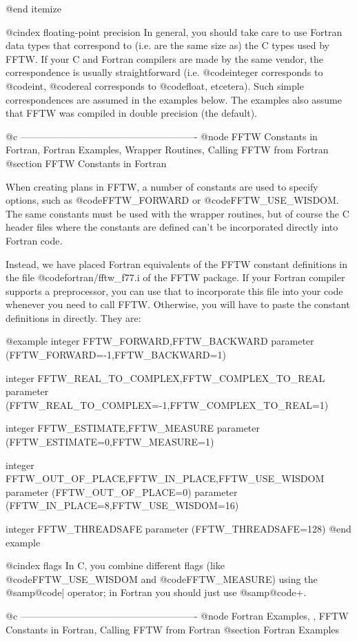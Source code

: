 @end itemize

@cindex floating-point precision
In general, you should take care to use Fortran data types that
correspond to (i.e. are the same size as) the C types used by FFTW.  If
your C and Fortran compilers are made by the same vendor, the
correspondence is usually straightforward (i.e. @code{integer}
corresponds to @code{int}, @code{real} corresponds to @code{float},
etcetera).  Such simple correspondences are assumed in the examples
below.  The examples also assume that FFTW was compiled in
double precision (the default).

@c -------------------------------------------------------
@node  FFTW Constants in Fortran, Fortran Examples, Wrapper Routines, Calling FFTW from Fortran
@section FFTW Constants in Fortran

When creating plans in FFTW, a number of constants are used to specify
options, such as @code{FFTW_FORWARD} or @code{FFTW_USE_WISDOM}.  The
same constants must be used with the wrapper routines, but of course the
C header files where the constants are defined can't be incorporated
directly into Fortran code.

Instead, we have placed Fortran equivalents of the FFTW constant
definitions in the file @code{fortran/fftw_f77.i} of the FFTW package.
If your Fortran compiler supports a preprocessor, you can use that to
incorporate this file into your code whenever you need to call FFTW.
Otherwise, you will have to paste the constant definitions in directly.
They are:

@example
      integer FFTW_FORWARD,FFTW_BACKWARD
      parameter (FFTW_FORWARD=-1,FFTW_BACKWARD=1)

      integer FFTW_REAL_TO_COMPLEX,FFTW_COMPLEX_TO_REAL
      parameter (FFTW_REAL_TO_COMPLEX=-1,FFTW_COMPLEX_TO_REAL=1)

      integer FFTW_ESTIMATE,FFTW_MEASURE
      parameter (FFTW_ESTIMATE=0,FFTW_MEASURE=1)

      integer FFTW_OUT_OF_PLACE,FFTW_IN_PLACE,FFTW_USE_WISDOM
      parameter (FFTW_OUT_OF_PLACE=0)
      parameter (FFTW_IN_PLACE=8,FFTW_USE_WISDOM=16)

      integer FFTW_THREADSAFE
      parameter (FFTW_THREADSAFE=128)
@end example

@cindex flags
In C, you combine different flags (like @code{FFTW_USE_WISDOM} and
@code{FFTW_MEASURE}) using the @samp{@code{|}} operator; in Fortran you
should just use @samp{@code{+}}.

@c -------------------------------------------------------
@node Fortran Examples,  , FFTW Constants in Fortran, Calling FFTW from Fortran
@section Fortran Examples

